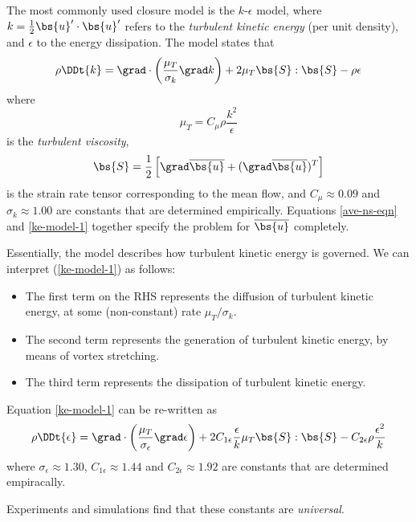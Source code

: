 The most commonly used closure model is the $k$-$\epsilon$ model, where
$k=\frac{1}{2}\bs{u}'\cdot\bs{u}'$ refers to the \textit{turbulent kinetic energy} (per
unit density), and $\epsilon$ to the energy dissipation. The model states that
\begin{equation}
    \rho\DDt{k}
    = \grad\cdot\left(\frac{\mu_T}{\sigma_k}\grad k\right) 
    + 2 \mu_T \bs{S}:\bs{S} 
    - \rho\epsilon
    \label{ke-model-1}
\end{equation}
where 
\begin{equation}
    \mu_T = C_\mu\rho\frac{k^2}{\epsilon}
\end{equation}
is the \textit{turbulent viscosity}, 
\begin{equation}
    \bs{S} = \frac{1}{2}\left[\grad\overline{\bs{u}} + (\grad\overline{\bs{u}})^T\right]
\end{equation}
is the strain rate tensor corresponding to the mean flow, and $C_\mu \approx
0.09$ and $\sigma_k\approx1.00$ are constants that are determined empirically.
Equations \ref{ave-ns-eqn} and \ref{ke-model-1} together specify the problem for
$\overline{\bs{u}}$ completely.

Essentially, the model describes how turbulent kinetic energy is governed. We
can interpret (\ref{ke-model-1}) as follows:
\begin{itemize}
    \item The first term on the RHS represents the diffusion of turbulent
        kinetic energy, at some (non-constant) rate $\mu_T/\sigma_k$.
    \item The second term represents the generation of turbulent kinetic energy,
        by means of vortex stretching.
    \item The third term represents the dissipation of turbulent kinetic energy.
\end{itemize}

Equation \ref{ke-model-1} can be re-written as 
\begin{equation}
    \rho\DDt{\epsilon} =
    \grad\cdot\left(\frac{\mu_T}{\sigma_\epsilon}\grad\epsilon\right)
    + 2 C_{1\epsilon} \frac{\epsilon}{k}\mu_T\bs{S}:\bs{S}
    - C_{2\epsilon}\rho\frac{\epsilon^2}{k}
\end{equation}
where $\sigma_\epsilon\approx1.30$, $C_{1\epsilon}\approx1.44$ and
$C_{2\epsilon}\approx1.92$ are constants that are determined empiracally.

Experiments and simulations find that these constants are \textit{universal}.

